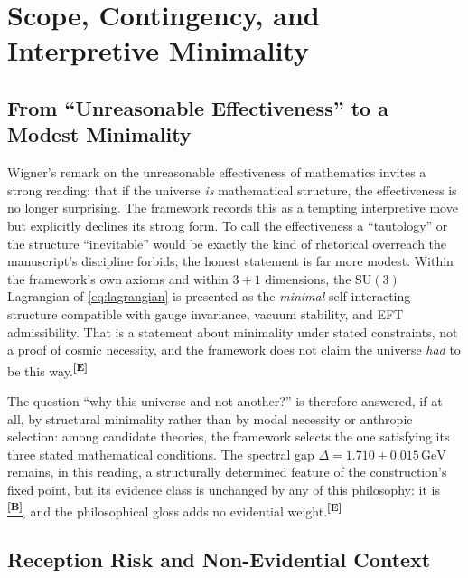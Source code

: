 \documentclass[12pt,a4paper,twoside]{article}
\theoremstyle{plain}
\theoremstyle{definition}
\theoremstyle{remark}
\newcommand{\GeV}{\,\mathrm{GeV}}
\newcommand{\catmark}[1]{\textsuperscript{\textsf{\textbf{[#1]}}}}
\newcommand{\Bdelta}{\hyperref[box:pi-override-delta]{\catmark{B}}}
\newcommand{\DeltaGap}{1.710 \pm 0.015\GeV} %
\begin{document}
\section{Scope, Contingency, and Interpretive Minimality}
\label{sec:inevitability-sociology}

\subsection{From ``Unreasonable Effectiveness'' to a Modest Minimality}
\label{subsec:inevitability}

Wigner's remark on the unreasonable effectiveness of mathematics invites a strong reading: that if the universe \emph{is} mathematical structure, the effectiveness is no longer surprising. The framework records this as a tempting interpretive move but explicitly declines its strong form. To call the effectiveness a ``tautology'' or the structure ``inevitable'' would be exactly the kind of rhetorical overreach the manuscript's discipline forbids; the honest statement is far more modest. Within the framework's own axioms and within $3+1$ dimensions, the $\mathrm{SU}(3)$ Lagrangian of \cref{eq:lagrangian} is presented as the \emph{minimal} self-interacting structure compatible with gauge invariance, vacuum stability, and EFT admissibility. That is a statement about minimality under stated constraints, not a proof of cosmic necessity, and the framework does not claim the universe \emph{had} to be this way.\catmark{E}

The question ``why this universe and not another?'' is therefore answered, if at all, by structural minimality rather than by modal necessity or anthropic selection: among candidate theories, the framework selects the one satisfying its three stated mathematical conditions. The spectral gap $\Delta = \DeltaGap$ remains, in this reading, a structurally determined feature of the construction's fixed point, but its evidence class is unchanged by any of this philosophy: it is \Bdelta, and the philosophical gloss adds no evidential weight.\catmark{E}

\subsection{Reception Risk and Non-Evidential Context}
\label{subsec:sociology}
\end{document}
